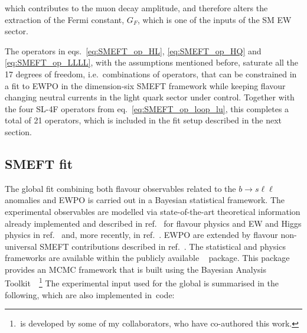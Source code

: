 which contributes to the muon decay amplitude, and therefore alters the extraction of the Fermi constant, $G_F$, which is one of the inputs of the SM EW sector.
\par The operators in eqs.~\eqref{eq:SMEFT_op_HL}, \eqref{eq:SMEFT_op_HQ} and \eqref{eq:SMEFT_op_LLLL}, with the assumptions mentioned before, saturate all the 17 degrees of freedom, i.e.~combinations of operators, that can be constrained in a fit to EWPO in the dimension-six SMEFT framework while keeping flavour changing neutral currents in the light quark sector under control. Together with the four SL-4F operators from eq.~\eqref{eq:SMEFT_op_loop_lu}, this completes a total of 21 operators, which is included in the fit setup described in the next section. 
\subsection{SMEFT fit}
\label{sec:strategy}
\par The global fit combining both flavour observables related to the $ b \to s \ell \ell$ anomalies and EWPO is carried out in a Bayesian statistical framework. The experimental observables are modelled via state-of-the-art theoretical information already implemented and described in ref.~\cite{Ciuchini:2019usw} for flavour physics and EW and Higgs physics in ref.~\cite{Ciuchini:2013pca} and, more recently, in ref.~\cite{deBlas:2016ojx}. EWPO are extended by flavour non-universal  SMEFT contributions described in ref.~\cite{Efrati:2015eaa,deBlas:2019wgy}. The statistical and physics frameworks are available within the publicly available \HEPfit~\cite{deBlas:2019okz} package. This package provides an MCMC framework that is built using the Bayesian Analysis Toolkit~\cite{2009CoPhC.180.2197C}~\footnote{ \HEPfit\,is developed by some of my collaborators, who have co-authored this work.} The experimental input used for the global is summarised in the following, which are also implemented in \HEPfit\,code: 

